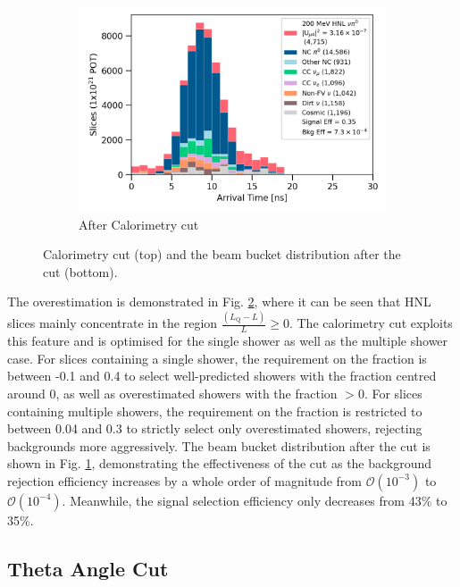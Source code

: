 \begin{figure}[ht!]
\begin{subfigure}[b]{0.495\textwidth}
            \includegraphics[width=\textwidth]{beam_bucket_postopt0}
            \caption{After Calorimetry cut}%
	    \label{fig:bb_opt0}
        \end{subfigure}
        \caption{
		Calorimetry cut (top) and the beam bucket distribution after the cut (bottom). 
	}
        \label{fig:opt0_cut}
\end{figure}

The overestimation is demonstrated in Fig. \ref{fig:opt0_cut}, where it can be seen that HNL slices mainly concentrate in the region $\frac{(L_{\mathrm{Q}} - L)}{L} \geq 0$. 
The calorimetry cut exploits this feature and is optimised for the single shower as well as the multiple shower case.
For slices containing a single shower, the requirement on the fraction is between -0.1 and 0.4 to select well-predicted showers with the fraction centred around 0, as well as overestimated showers with the fraction $> 0$. 
For slices containing multiple showers, the requirement on the fraction is restricted to between 0.04 and 0.3 to strictly select only overestimated showers, rejecting backgrounds more aggressively.
The beam bucket distribution after the cut is shown in Fig. \ref{fig:bb_opt0}, demonstrating the effectiveness of the cut as the background rejection efficiency increases by a whole order of magnitude from $\mathcal{O}(10^{-3})$ to $\mathcal{O}(10^{-4})$. 
Meanwhile, the signal selection efficiency only decreases from 43\% to 35\%.

\subsection{Theta Angle Cut}
\label{sec:theta_cut}

